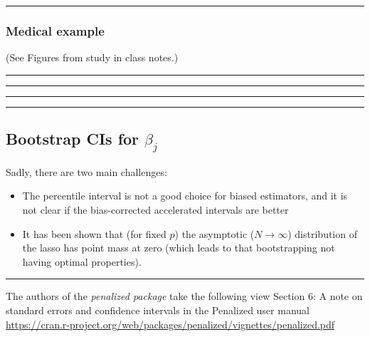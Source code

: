 \documentclass[
  letterpaper,
  DIV=11,
  numbers=noendperiod]{scrartcl}
\providecommand{\tightlist}{%
  \setlength{\itemsep}{0pt}\setlength{\parskip}{0pt}}\usepackage{longtable,booktabs,array}
\begin{document}
\begin{center}\rule{0.5\linewidth}{0.5pt}\end{center}

\hypertarget{medical-example}{%
\subsubsection{Medical example}\label{medical-example}}

(See Figures from study in class notes.)

\begin{center}\rule{0.5\linewidth}{0.5pt}\end{center}

\begin{center}\rule{0.5\linewidth}{0.5pt}\end{center}

\begin{center}\rule{0.5\linewidth}{0.5pt}\end{center}

\begin{center}\rule{0.5\linewidth}{0.5pt}\end{center}

\hypertarget{bootstrap-cis-for-beta_j}{%
\subsection{\texorpdfstring{Bootstrap CIs for
\(\beta_j\)}{Bootstrap CIs for \textbackslash beta\_j}}\label{bootstrap-cis-for-beta_j}}

Sadly, there are two main challenges:

\begin{itemize}
\tightlist
\item
  The percentile interval is not a good choice for biased estimators,
  and it is not clear if the bias-corrected accelerated intervals are
  better
\item
  It has been shown that (for fixed \(p\)) the asymptotic
  (\(N\rightarrow \infty\)) distribution of the lasso has point mass at
  zero (which leads to that bootstrapping not having optimal
  properties).
\end{itemize}

\begin{center}\rule{0.5\linewidth}{0.5pt}\end{center}

The authors of the \emph{penalized package} take the following view
Section 6: A note on standard errors and confidence intervals in the
Penalized user manual
\url{https://cran.r-project.org/web/packages/penalized/vignettes/penalized.pdf}
\end{document}
